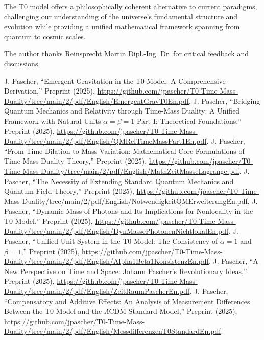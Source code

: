 \documentclass[aps,prl,twocolumn,superscriptaddress,nofootinbib]{revtex4-2}
\begin{document}
	The T0 model offers a philosophically coherent alternative to current paradigms, challenging our understanding of the universe's fundamental structure and evolution while providing a unified mathematical framework spanning from quantum to cosmic scales.
	
	\begin{acknowledgments}
		The author thanks Reinsprecht Martin Dipl.-Ing. Dr. for critical feedback and discussions.
	\end{acknowledgments}
	
	\begin{thebibliography}{99}
		 J. Pascher, ``Emergent Gravitation in the T0 Model: A Comprehensive Derivation,'' Preprint (2025), \url{https://github.com/jpascher/T0-Time-Mass-Duality/tree/main/2/pdf/English/EmergentGravT0En.pdf}.
		 J. Pascher, ``Bridging Quantum Mechanics and Relativity through Time-Mass Duality: A Unified Framework with Natural Units $\alpha = \beta = 1$ Part I: Theoretical Foundations,'' Preprint (2025), \url{https://github.com/jpascher/T0-Time-Mass-Duality/tree/main/2/pdf/English/QMRelTimeMassPart1En.pdf}.
		 J. Pascher, ``From Time Dilation to Mass Variation: Mathematical Core Formulations of Time-Mass Duality Theory,'' Preprint (2025), \url{https://github.com/jpascher/T0-Time-Mass-Duality/tree/main/2/pdf/English/MathZeitMasseLagrange.pdf}.
		 J. Pascher, ``The Necessity of Extending Standard Quantum Mechanics and Quantum Field Theory,'' Preprint (2025), \url{https://github.com/jpascher/T0-Time-Mass-Duality/tree/main/2/pdf/English/NotwendigkeitQMErweiterungEn.pdf}.
		 J. Pascher, ``Dynamic Mass of Photons and Its Implications for Nonlocality in the T0 Model,'' Preprint (2025), \url{https://github.com/jpascher/T0-Time-Mass-Duality/tree/main/2/pdf/English/DynMassePhotonenNichtlokalEn.pdf}.
		 J. Pascher, ``Unified Unit System in the T0 Model: The Consistency of $\alpha = 1$ and $\beta = 1$,'' Preprint (2025), \url{https://github.com/jpascher/T0-Time-Mass-Duality/tree/main/2/pdf/English/Alpha1Beta1KonsistenzEn.pdf}.
		 J. Pascher, ``A New Perspective on Time and Space: Johann Pascher's Revolutionary Ideas,'' Preprint (2025), \url{https://github.com/jpascher/T0-Time-Mass-Duality/tree/main/2/pdf/English/ZeitRaumPascherEn.pdf}.
		 J. Pascher, ``Compensatory and Additive Effects: An Analysis of Measurement Differences Between the T0 Model and the $\Lambda$CDM Standard Model,'' Preprint (2025), \url{https://github.com/jpascher/T0-Time-Mass-Duality/tree/main/2/pdf/English/MessdifferenzenT0StandardEn.pdf}.

\end{thebibliography}
\end{document}
